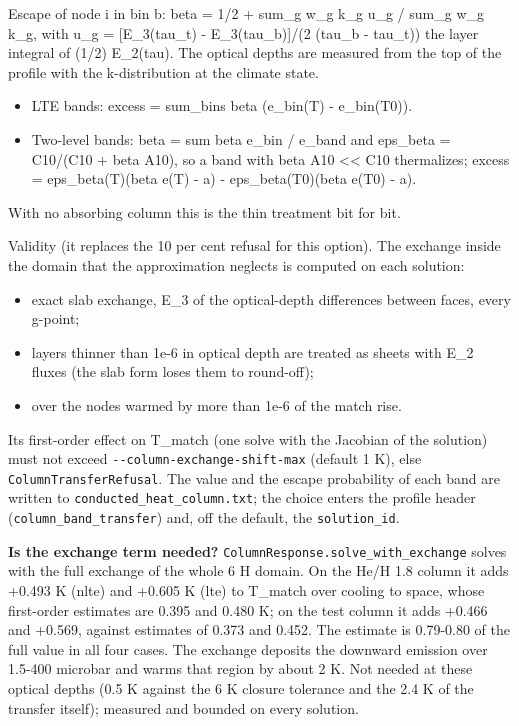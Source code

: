 \documentclass[english,a4paper]{my_memo}
\providecommand{\tightlist}{\setlength{\itemsep}{0pt}\setlength{\parskip}{0pt}}
\begin{document}
Escape of node i in bin b: beta = 1/2 + sum\_g w\_g k\_g u\_g / sum\_g w\_g k\_g,
with u\_g = {[}E\_3(tau\_t) - E\_3(tau\_b){]}/(2 (tau\_b - tau\_t)) the layer integral
of (1/2) E\_2(tau). The optical depths are measured from the top of the
profile with the k-distribution at the climate state.

\begin{itemize}
\tightlist
\item
  LTE bands: excess = sum\_bins beta (e\_bin(T) - e\_bin(T0)).
\item
  Two-level bands: beta = sum beta e\_bin / e\_band and
  eps\_beta = C10/(C10 + beta A10), so a band with beta A10 \textless\textless{} C10
  thermalizes; excess = eps\_beta(T)(beta e(T) - a) - eps\_beta(T0)(beta
  e(T0) - a).
\end{itemize}

With no absorbing column this is the thin treatment bit for bit.

Validity (it replaces the 10 per cent refusal for this option). The exchange
inside the domain that the approximation neglects is computed on each
solution:

\begin{itemize}
\tightlist
\item
  exact slab exchange, E\_3 of the optical-depth differences between faces,
  every g-point;
\item
  layers thinner than 1e-6 in optical depth are treated as sheets with E\_2
  fluxes (the slab form loses them to round-off);
\item
  over the nodes warmed by more than 1e-6 of the match rise.
\end{itemize}

Its first-order effect on T\_match (one solve with the Jacobian of the
solution) must not exceed \texttt{-\/-column-exchange-shift-max} (default 1 K),
else \texttt{ColumnTransferRefusal}. The value and the escape probability of each
band are written to \texttt{conducted\_heat\_column.txt}; the choice enters the
profile header (\texttt{column\_band\_transfer}) and, off the default, the
\texttt{solution\_id}.

\textbf{Is the exchange term needed?} \texttt{ColumnResponse.solve\_with\_exchange} solves
with the full exchange of the whole 6 H domain. On the He/H 1.8 column it
adds +0.493 K (nlte) and +0.605 K (lte) to T\_match over cooling to space,
whose first-order estimates are 0.395 and 0.480 K; on the test column it
adds +0.466 and +0.569, against estimates of 0.373 and 0.452. The estimate
is 0.79-0.80 of the full value in all four cases. The exchange deposits the
downward emission over 1.5-400 microbar and warms that region by about 2 K.
Not needed at these optical depths (0.5 K against the 6 K closure tolerance
and the 2.4 K of the transfer itself); measured and bounded on every
solution.
\end{document}
